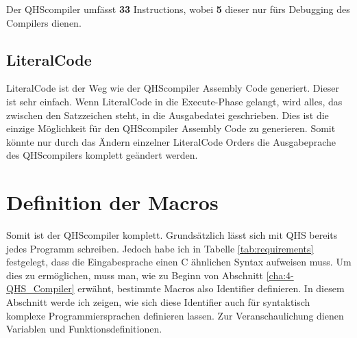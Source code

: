 Der QHScompiler umfässt \textbf{33} Instructions, wobei \textbf{5} dieser nur fürs Debugging des Compilers dienen.

\subsection{LiteralCode}
LiteralCode ist der Weg wie der QHScompiler Assembly Code generiert. Dieser ist sehr einfach. Wenn LiteralCode in die Execute-Phase gelangt, wird alles, das zwischen den Satzzeichen steht, in die Ausgabedatei geschrieben.
Dies ist die einzige Möglichkeit für den QHScompiler Assembly Code zu generieren. Somit könnte nur durch das Ändern einzelner LiteralCode Orders die Ausgabeprache des QHScompilers komplett geändert werden.


\section{Definition der Macros} \label{sec:qhs-macro_definitions}
Somit ist der QHScompiler komplett. Grundsätzlich lässt sich mit QHS bereits jedes Programm schreiben. 
Jedoch habe ich in Tabelle \ref{tab:requirements} festgelegt, dass die Eingabesprache einen C ähnlichen Syntax aufweisen muss.
Um dies zu ermöglichen, muss man, wie zu Beginn von Abschnitt \ref{cha:4-QHS_Compiler} erwähnt, bestimmte Macros also Identifier definieren.
In diesem Abschnitt werde ich zeigen, wie sich diese Identifier auch für syntaktisch komplexe Programmiersprachen definieren lassen.
Zur Veranschaulichung dienen Variablen und Funktionsdefinitionen.

